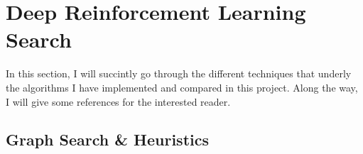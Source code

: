 
\chapter{Deep Reinforcement Learning Search} %

\label{Chapter1} %

In this section, I will succintly go through the different techniques that underly the algorithms I have implemented and compared in this project. Along the way, I will give some references for the interested reader.



\section{Graph Search \& Heuristics}

\label{GSH}


